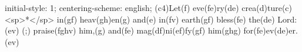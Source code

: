 initial-style: 1;
centering-scheme: english;
(c4)Let(f) eve(fe)ry(de) crea(d)ture(c) <sp>*</sp> in(gf) heav(gh)en(g) and(e) in(fv) earth(gf) bless(fe) the(de) Lord:(ev) (;) praise(fghv) him,(g) and(fe) mag(df)ni(ef)fy(gf) him(ghg) for(fe)ev(de)er.(ev)
